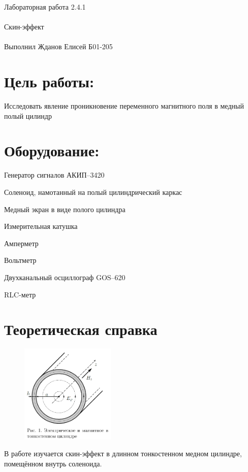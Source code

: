 \documentclass{astroedu-lab}
\begin{document}
\pagestyle{plain}

\begin{problem}{\huge Лабораторная работа 2.4.1\\\\Скин-эффект\\\\Выполнил Жданов Елисей Б01-205}

\section{Цель работы:}

Исследовать явление проникновение переменного магнитного поля в медный полый цилиндр

\section{Оборудование:}

Генератор сигналов АКИП–3420

Соленоид, намотанный на полый цилиндрический каркас

Медный экран в виде полого цилиндра

Измерительная катушка

Амперметр

Вольтметр

Двухканальный осциллограф GOS–620

RLC-метр

\section{Теоретическая справка}

\begin{figure}[!h]
	\centering
	\includegraphics[width=0.4\textwidth]{уст1.png}
	\label{fig:boiler}
\end{figure}


В работе изучается скин-эффект в длинном тонкостенном медном цилиндре, помещённом внутрь соленоида.


\end{problem}
\end{document}
